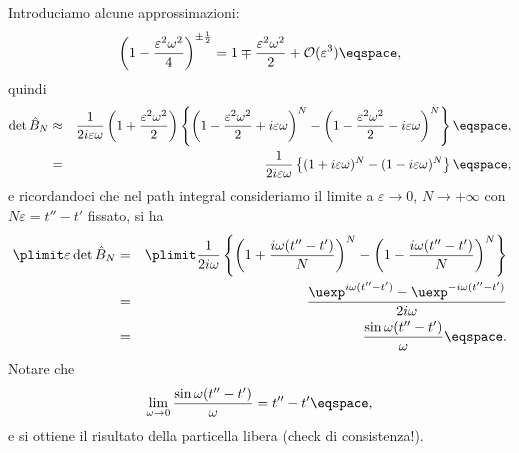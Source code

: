 Introduciamo  alcune  approssimazioni:
\begin{displaymath}
\left( 1- \frac{\varepsilon^{2}\omega^{2}}{4} \right)^{\pm\frac{1}{2}} = 
1 \mp \frac{\varepsilon^{2}\omega^{2}}{2} + \mathcal{O} (\varepsilon^{3})
\eqspace, 
\end{displaymath}
quindi 
\begin{eqnarray*}
\det \hat{B}_{N} &\approx&
\frac{1} {2i\varepsilon \omega} 
\left( 1 + \frac{\varepsilon^{2} \omega^{2}}{2} \right) \left\{ 
\left( 1 -
\frac{\varepsilon^{2}\omega^{2}}{2} + i\varepsilon \omega  \right)^{N} - 
\left( 1 -
\frac{\varepsilon^{2}\omega^{2}}{2} - i\varepsilon \omega  \right)^{N} \right\}
\eqspace, \\
&=& 
\frac{1}{2i \varepsilon \omega} \left\{ ( 1 + i \varepsilon \omega)^{N} - ( 1 -
i \varepsilon \omega)^{N} \right\} \eqspace, 
\end{eqnarray*}
e ricordandoci che nel path integral consideriamo il limite a
$\varepsilon\rightarrow 0 $, $N\rightarrow+\infty$ con $N\varepsilon= t'' -t '$
fissato,  si ha 
\begin{eqnarray*}
\plimit  \varepsilon \det\hat{B}_{N}  &=& 
\plimit \frac{1}{2i \omega} \left\{ \left( 1 + \frac{i\omega
(t''-t')}{N}\right)^{N} - \left( 1   - \frac{i \omega (t''-t')}{N} \right)^{N}
\right\} \\
&=& \frac{ \uexp^{ i \omega (t''-t')} - \uexp^{ - i \omega
(t''-t')}}{2i\omega} \\
&=& \frac{\sin \omega (t''-t')}{\omega } \eqspace .
\end{eqnarray*}
Notare che 
\begin{displaymath}
\lim_{\omega\rightarrow 0 } \frac{\sin \omega(t''-t')}{\omega} = t''- t'
\eqspace ,
\end{displaymath}
e si ottiene il risultato della particella libera (check di consistenza!).



\printbibliography
